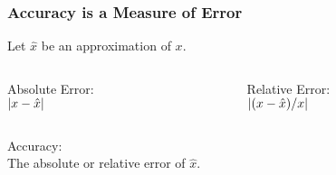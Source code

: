 \begin{frame}

\frametitle{Accuracy is a Measure of Error}

\vspace{\fill}

\begin{center}

Let $\hat{x}$ be an approximation of $x$.

\end{center}

\vspace{\fill}

\begin{columns}[t]

\begin{column}{0.5\textwidth}

\begin{center}

Absolute Error: \\ ${ \mathopen{} \left| {x-\hat{x}} \right| \mathclose{} }$

\end{center}

\end{column}

\begin{column}{0.5\textwidth}

\begin{center}

Relative Error: \\ ${ \mathopen{} \left| {{ \mathopen{} \left( {x-\hat{x}} \right) \mathclose{} } / \displaystyle x} \right| \mathclose{} }$

\end{center}

\end{column}

\end{columns}

\begin{center}

Accuracy: \\ The absolute or relative error of $\hat{x}$.

\end{center}

\vspace{\fill}

\end{frame}


